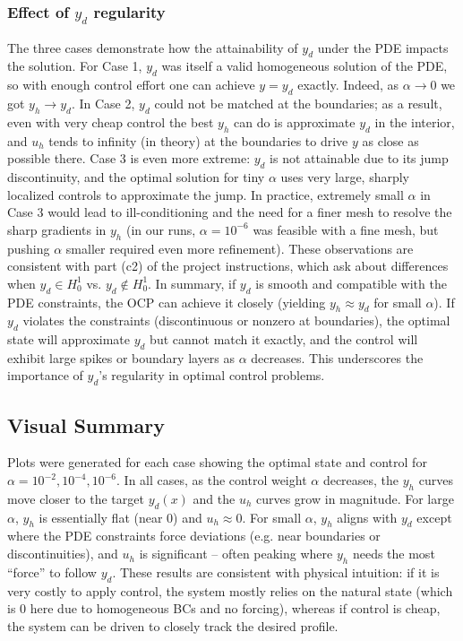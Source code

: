 \documentclass{article}
\begin{document}
\subsubsection{Effect of $y_d$ regularity}
The three cases demonstrate how the attainability of $y_d$ under the PDE impacts the solution. For Case 1, $y_d$ was itself a valid homogeneous solution of the PDE, so with enough control effort one can achieve $y=y_d$ exactly. Indeed, as $\alpha\to 0$ we got $y_h\to y_d$. In Case 2, $y_d$ could not be matched at the boundaries; as a result, even with very cheap control the best $y_h$ can do is approximate $y_d$ in the interior, and $u_h$ tends to infinity (in theory) at the boundaries to drive $y$ as close as possible there. Case 3 is even more extreme: $y_d$ is not attainable due to its jump discontinuity, and the optimal solution for tiny $\alpha$ uses very large, sharply localized controls to approximate the jump. In practice, extremely small $\alpha$ in Case 3 would lead to ill-conditioning and the need for a finer mesh to resolve the sharp gradients in $y_h$ (in our runs, $\alpha=10^{-6}$ was feasible with a fine mesh, but pushing $\alpha$ smaller required even more refinement). These observations are consistent with part (c2) of the project instructions, which ask about differences when $y_d \in H^1_0$ vs. $y_d\notin H^1_0$. In summary, if $y_d$ is smooth and compatible with the PDE constraints, the OCP can achieve it closely (yielding $y_h \approx y_d$ for small $\alpha$). If $y_d$ violates the constraints (discontinuous or nonzero at boundaries), the optimal state will approximate $y_d$ but cannot match it exactly, and the control will exhibit large spikes or boundary layers as $\alpha$ decreases. This underscores the importance of $y_d$’s regularity in optimal control problems.

\subsection{Visual Summary}
Plots were generated for each case showing the optimal state and control for $\alpha=10^{-2}, 10^{-4}, 10^{-6}$. In all cases, as the control weight $\alpha$ decreases, the $y_h$ curves move closer to the target $y_d(x)$ and the $u_h$ curves grow in magnitude. For large $\alpha$, $y_h$ is essentially flat (near 0) and $u_h\approx 0$. For small $\alpha$, $y_h$ aligns with $y_d$ except where the PDE constraints force deviations (e.g. near boundaries or discontinuities), and $u_h$ is significant – often peaking where $y_h$ needs the most “force” to follow $y_d$. These results are consistent with physical intuition: if it is very costly to apply control, the system mostly relies on the natural state (which is 0 here due to homogeneous BCs and no forcing), whereas if control is cheap, the system can be driven to closely track the desired profile.
\end{document}

